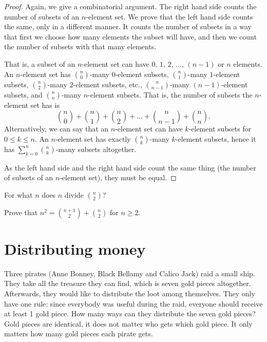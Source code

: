 \begin{proof}
Again, we give a combinatorial argument. 
The right hand side counts the number of subsets of an $n$-element set. 
We prove that the left hand side counts the same, 
only in a different manner. 
It counts the number of subsets in a way that first we choose how many elements the subset will have, 
and then we count the number of subsets with that many elements. 

That is, 
a subset of an $n$-element set can have $0$, $1$, $2$, $\dots $, $(n-1)$ or $n$ elements. 
An $n$-element set has $\binom{n}{0}$-many $0$-element subsets, 
$\binom{n}{1}$-many $1$-element subsets, 
$\binom{n}{2}$-many $2$-element subsets, etc., 
$\binom{n}{n-1}$-many $(n-1)$-element subsets, 
and $\binom{n}{n}$-many $n$-element subsets. 
That is, the number of subsets the $n$-element set has is 
\[
\binom{n}{0} + \binom{n}{1} + \binom{n}{2} + \dots + \binom{n}{n-1} + \binom{n}{n}. 
\]
Alternatively, we can say that an $n$-element set can have $k$-element subsets for $0 \leq k\leq n$. 
An $n$-element set has exactly $\binom{n}{k}$-many $k$-element subsets, 
hence it has $\sum_{k=0}^n \binom{n}{k}$-many subsets altogether. 

As the left hand side and the right hand side count the same thing 
(the number of subsets of an $n$-element set), 
they must be equal. 
\end{proof}


\begin{exercise}\label{ex:nmidnchoose2}
For what $n$ does $n$ divide $\binom{n}{2}$? 
\end{exercise}

\begin{exercise}\label{ex:n^2binom}
Prove that $n^2 = \binom{n+1}{2} + \binom{n}{2}$ for $n\geq 2$. 
\end{exercise}

\section{Distributing money}\label{sec:money}

Three pirates (Anne Bonney, Black Bellamy and Calico Jack) raid a small ship. 
They take all the treasure they can find, 
which is seven gold pieces altogether. 
Afterwards, they would like to distribute the loot among themselves. 
They only have one rule: since everybody was useful during the raid, 
everyone should receive at least 1 gold piece. 
How many ways can they distribute the seven gold pieces? 
Gold pieces are identical, 
it does not matter who gets which gold piece. 
It only matters how many gold pieces each pirate gets. 

